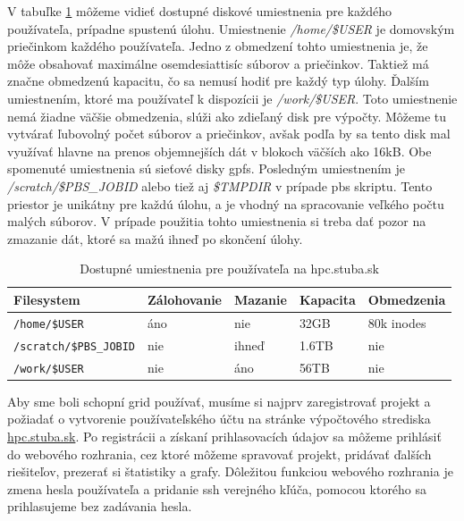 V tabuľke \ref{tab:filesystem} môžeme vidieť dostupné diskové umiestnenia pre každého používateľa, prípadne spustenú úlohu.
Umiestnenie \textit{/home/\$USER} je domovským priečinkom každého používateľa.
Jedno z obmedzení tohto umiestnenia je, že môže obsahovať maximálne osemdesiattisíc súborov a priečinkov.
Taktiež má značne obmedzenú kapacitu, čo sa nemusí hodiť pre každý typ úlohy.
Ďalším umiestnením, ktoré ma používateľ k dispozícii je \textit{/work/\$USER}.
Toto umiestnenie nemá žiadne väčšie obmedzenia, slúži ako zdieľaný disk pre výpočty.
Môžeme tu vytvárať ľubovolný počet súborov a priečinkov, avšak podľa \cite{hpc} by sa tento disk mal využívať hlavne na prenos objemnejších dát v blokoch väčších ako 16kB. Obe spomenuté umiestnenia sú sieťové disky \acrshort{gpfs}.
Posledným umiestnením je \textit{/scratch/\$PBS\_JOBID} alebo tiež aj \textit{\$TMPDIR} v prípade \acrshort{pbs} skriptu.
Tento priestor je unikátny pre každú úlohu, a je vhodný na spracovanie veľkého počtu malých súborov.
V prípade použitia tohto umiestnenia si treba dať pozor na zmazanie dát, ktoré sa mažú ihneď po skončení úlohy.

\begin{table}[!h]
\centering
\begin{tabular}{@{}lllll@{}}
\toprule
\textbf{Filesystem}   & \textbf{Zálohovanie} & \textbf{Mazanie} & \textbf{Kapacita} & \textbf{Obmedzenia} \\ \midrule
\texttt{/home/\$USER}          & áno                  & nie              & 32GB              & 80k inodes          \\
\texttt{/scratch/\$PBS\_JOBID} & nie                  & ihneď            & 1.6TB             & nie                 \\
\texttt{/work/\$USER}          & nie                  & áno              & 56TB              & nie                 \\ \bottomrule
\end{tabular}
\caption{Dostupné umiestnenia pre používateľa na hpc.stuba.sk}
\label{tab:filesystem}
\end{table}

Aby sme boli schopní grid používať, musíme si najprv zaregistrovať projekt a požiadať o vytvorenie
používateľského účtu na stránke výpočtového strediska \url{hpc.stuba.sk}.
Po registrácii a získaní prihlasovacích údajov sa môžeme prihlásiť do webového rozhrania, cez ktoré môžeme spravovať projekt,
pridávať ďalších riešiteľov, prezerať si štatistiky a grafy.
Dôležitou funkciou webového rozhrania je zmena hesla používateľa a pridanie \acrshort{ssh} verejného kľúča, pomocou ktorého sa prihlasujeme bez zadávania hesla.

